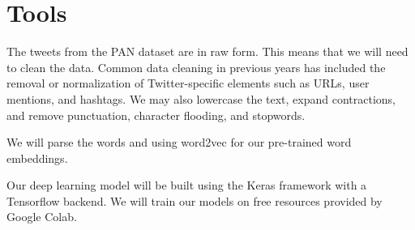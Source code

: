 \documentclass[11pt,a4paper]{article}
\begin{document}
\section{Tools}

The tweets from the PAN dataset are in raw form. This means that we will need to clean the data. Common data cleaning in previous years has included the removal or normalization of Twitter-specific elements such as URLs, user mentions, and hashtags. We may also lowercase the text, expand contractions, and remove punctuation, character flooding, and stopwords.

We will parse the words and using word2vec for our pre-trained word embeddings. 

Our deep learning model will be built using the Keras framework with a Tensorflow backend. We will train our models on free resources provided by Google Colab. 



\footnotesize

\end{document}
